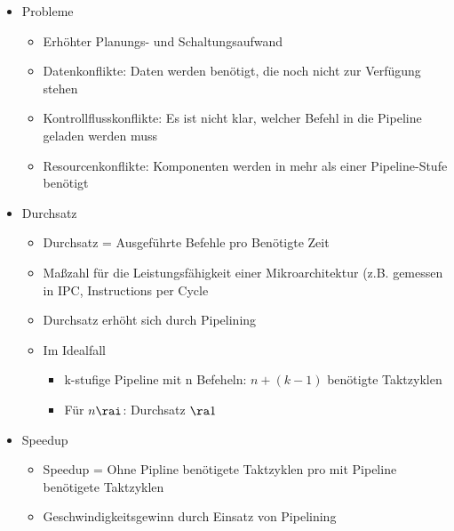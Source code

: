 \documentclass{kit}
\begin{document}
\begin{itemize}
\begin{itemize}
\begin{itemize}
              Gegenteil)
            \item Aber: Pipelining erhöht den Durchsatz bei der Ausführung einer Befehlsfolge
            \item Im (theoretischen) Idealfall: Nach Befüllen der Pipeline wird jeden Takt die
              Ausführung eines Befehls abgeschlossen
            \item Maximal mögliche Taktfrequenz der Pipeline richtet sich nach der langsamsten 
              Pipeline-Stufe
          \end{itemize}
        \item Probleme
          \begin{itemize}
            \item Erhöhter Planungs- und Schaltungsaufwand
            \item Datenkonflikte: Daten werden benötigt, die noch nicht zur Verfügung stehen
            \item Kontrollflusskonflikte: Es ist nicht klar, welcher Befehl in die Pipeline geladen
              werden muss
            \item Resourcenkonflikte: Komponenten werden in mehr als einer Pipeline-Stufe benötigt
          \end{itemize}
        \item Durchsatz
          \begin{itemize}
            \item Durchsatz = Ausgeführte Befehle pro Benötigte Zeit
            \item Maßzahl für die Leistungsfähigkeit einer Mikroarchitektur (z.B. gemessen in  IPC,
              Instructions per Cycle
            \item Durchsatz erhöht sich durch Pipelining
            \item Im Idealfall
              \begin{itemize}
                \item k-stufige Pipeline mit n Befeheln: $n+(k-1)$ benötigte Taktzyklen
                \item Für $n\rai$: Durchsatz $\ra1$
              \end{itemize}
          \end{itemize}
        \item Speedup
          \begin{itemize}
            \item Speedup = Ohne Pipline benötigete Taktzyklen pro mit Pipeline benötigete Taktzyklen
            \item Geschwindigkeitsgewinn durch Einsatz von Pipelining

\end{itemize}
\end{itemize}
\end{itemize}
\end{document}
